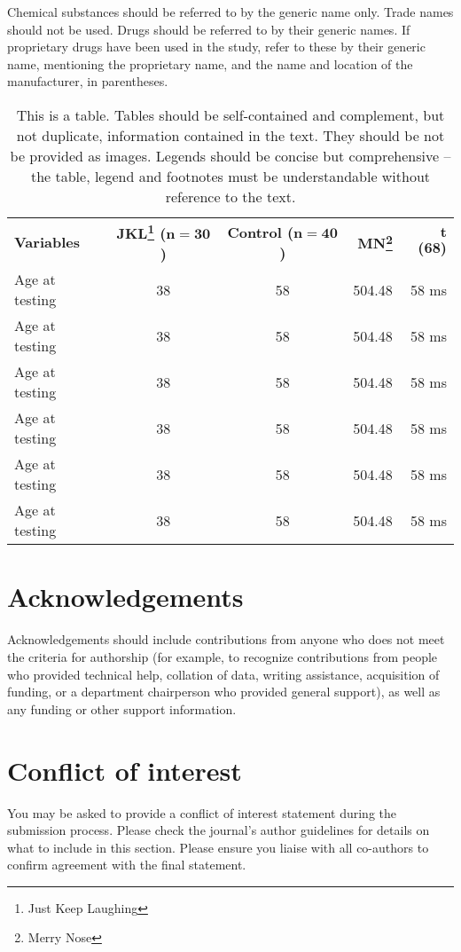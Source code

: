 \documentclass[num-refs]{wiley-article}
\begin{document}
Chemical substances should be referred to by the generic name only. Trade names should not be used. Drugs should be referred to by their generic names. If proprietary drugs have been used in the study, refer to these by their generic name, mentioning the proprietary name, and the name and location of the manufacturer, in parentheses.
\begin{table}
\caption{{This is a table. Tables should be self-contained and complement, but not duplicate, information contained in the text. They should be not be provided as images. Legends should be concise but comprehensive -- the table, legend and footnotes must be understandable without reference to the text.}}
\begin{tabular}{lccrr}
\hline
\textbf{Variables} & \textbf{JKL\footnote{Just Keep Laughing} ($\boldsymbol{n=30}$)} & \textbf{Control ($\boldsymbol{n=40}$)} & \textbf{MN\footnote{Merry Nose}} & \textbf{$\boldsymbol t$ (68)}\\
Age at testing & 38 & 58 & 504.48 & 58 ms\\
Age at testing & 38 & 58 & 504.48 & 58 ms\\
Age at testing & 38 & 58 & 504.48 & 58 ms\\
Age at testing & 38 & 58 & 504.48 & 58 ms\\
Age at testing & 38 & 58 & 504.48 & 58 ms\\
Age at testing & 38 & 58 & 504.48 & 58 ms\\
\hline  
\end{tabular}
\end{table}


\section*{Acknowledgements}
Acknowledgements should include contributions from anyone who does not meet the criteria for authorship (for example, to recognize contributions from people who provided technical help, collation of data, writing assistance, acquisition of funding, or a department chairperson who provided general support), as well as any funding or other support information.

\section*{Conflict of interest}
You may be asked to provide a conflict of interest statement during the submission process. Please check the journal's author guidelines for details on what to include in this section. Please ensure you liaise with all co-authors to confirm agreement with the final statement.

\FloatBarrier

\end{document}
